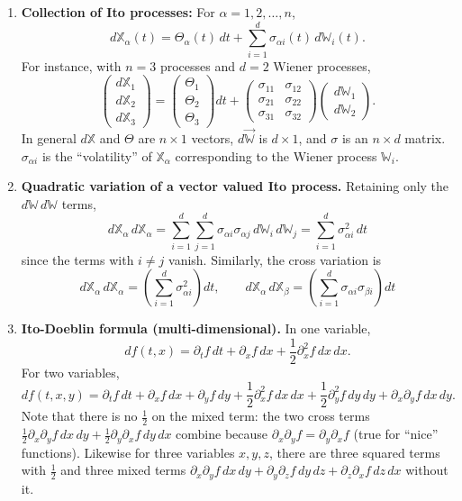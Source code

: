 \begin{enumerate}
    \item \textbf{Collection of Ito processes:} For $\alpha = 1, 2, \dots, n$,
    \[d\mathbb{X}_\alpha(t) = \Theta_\alpha(t)\, dt + \sum_{i=1}^{d}\sigma_{\alpha i}(t)\, d\mathbb{W}_i(t).\]
    For instance, with $n = 3$ processes and $d = 2$ Wiener processes,
    \[\begin{pmatrix}d\mathbb{X}_1 \\ d\mathbb{X}_2 \\ d\mathbb{X}_3\end{pmatrix} = \begin{pmatrix}\Theta_1 \\ \Theta_2 \\ \Theta_3\end{pmatrix}dt + \begin{pmatrix}\sigma_{11} & \sigma_{12} \\ \sigma_{21} & \sigma_{22} \\ \sigma_{31} & \sigma_{32}\end{pmatrix}\begin{pmatrix}d\mathbb{W}_1 \\ d\mathbb{W}_2\end{pmatrix}.\]
    In general $d\mathbb{X}$ and $\Theta$ are $n \times 1$ vectors, $d\vec{\mathbb{W}}$ is $d \times 1$, and $\sigma$ is an $n \times d$ matrix. $\sigma_{\alpha i}$ is the ``volatility'' of $\mathbb{X}_\alpha$ corresponding to the Wiener process $\mathbb{W}_i$.

    \item \textbf{Quadratic variation of a vector valued Ito process.} Retaining only the $d\mathbb{W}\, d\mathbb{W}$ terms,
    \[d\mathbb{X}_\alpha\, d\mathbb{X}_\alpha = \sum_{i=1}^{d}\sum_{j=1}^{d}\sigma_{\alpha i}\sigma_{\alpha j}\, d\mathbb{W}_i\, d\mathbb{W}_j = \sum_{i=1}^{d}\sigma_{\alpha i}^2\, dt\]
    since the terms with $i \neq j$ vanish. Similarly, the cross variation is
    \[\boxed{d\mathbb{X}_\alpha\, d\mathbb{X}_\alpha = \left(\sum_{i=1}^{d}\sigma_{\alpha i}^2\right)dt, \qquad d\mathbb{X}_\alpha\, d\mathbb{X}_\beta = \left(\sum_{i=1}^{d}\sigma_{\alpha i}\sigma_{\beta i}\right)dt}\]

    \item \textbf{Ito-Doeblin formula (multi-dimensional).} In one variable,
    \[df(t, x) = \partial_t f\, dt + \partial_x f\, dx + \frac{1}{2}\partial_x^2 f\, dx\, dx.\]
    For two variables,
    \[df(t, x, y) = \partial_t f\, dt + \partial_x f\, dx + \partial_y f\, dy + \frac{1}{2}\partial_x^2 f\, dx\, dx + \frac{1}{2}\partial_y^2 f\, dy\, dy + \partial_x\partial_y f\, dx\, dy.\]
    Note that there is no $\frac{1}{2}$ on the mixed term: the two cross terms $\frac{1}{2}\partial_x\partial_y f\, dx\, dy + \frac{1}{2}\partial_y\partial_x f\, dy\, dx$ combine because $\partial_x\partial_y f = \partial_y\partial_x f$ (true for ``nice'' functions). Likewise for three variables $x, y, z$, there are three squared terms with $\frac{1}{2}$ and three mixed terms $\partial_x\partial_y f\, dx\, dy + \partial_y\partial_z f\, dy\, dz + \partial_z\partial_x f\, dz\, dx$ without it.


\end{enumerate}
